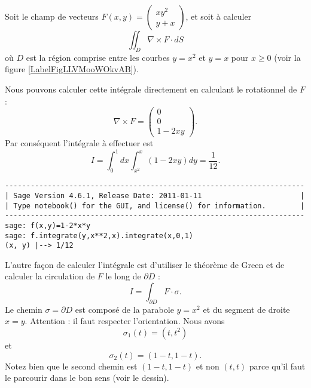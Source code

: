 \begin{example}     \label{ExempleGreenSqL}
    Soit le champ de vecteurs $F(x,y)=\begin{pmatrix}
        xy^2    \\ 
        y+x    
    \end{pmatrix}$, et soit à calculer
    \begin{equation}
        \iint_D\nabla\times F\cdot dS
    \end{equation}
    où $D$ est la région comprise entre les courbes $y=x^2$ et $y=x$ pour $x\geq 0$ (voir la figure \ref{LabelFigLLVMooWOkvAB}).

\newcommand{\CaptionFigLLVMooWOkvAB}{Le contour d'intégration pour l'exemple \ref{ExempleGreenSqL}.}


    Nous pouvons calculer cette intégrale directement en calculant le rotationnel de $F$:
    \begin{equation}
        \nabla\times F=\begin{pmatrix}
            0    \\ 
            0    \\ 
            1-2xy    
        \end{pmatrix}.
    \end{equation}
    Par conséquent l'intégrale à effectuer est
    \begin{equation}
        I=\int_0^1 dx\int_{x^2}^x(1-2xy)dy=\frac{1}{ 12 }.
    \end{equation}
    \begin{verbatim}
----------------------------------------------------------------------
| Sage Version 4.6.1, Release Date: 2011-01-11                       |
| Type notebook() for the GUI, and license() for information.        |
----------------------------------------------------------------------
sage: f(x,y)=1-2*x*y
sage: f.integrate(y,x**2,x).integrate(x,0,1)
(x, y) |--> 1/12
    \end{verbatim}
    
    L'autre façon de calculer l'intégrale est d'utiliser le théorème de Green et de calculer la circulation de $F$ le long de $\partial D$ :
    \begin{equation}
        I=\int_{\partial D}F\cdot \sigma.
    \end{equation}
    Le chemin $\sigma=\partial D$ est composé de la parabole $y=x^2$ et du segment de droite $x=y$. Attention : il faut respecter l'orientation. Nous avons
    \begin{equation}
        \sigma_1(t)=(t,t^2)
    \end{equation}
    et
    \begin{equation}
        \sigma_2(t)=(1-t,1-t).
    \end{equation}
    Notez bien que le second chemin est $(1-t,1-t)$ et non $(t,t)$ parce qu'il faut le parcourir dans le bon sens (voir le dessin).


\end{example}
